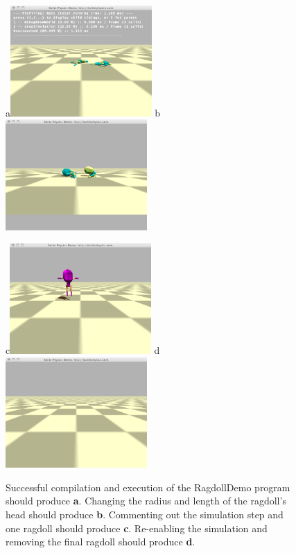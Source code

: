 \documentclass[12pt]{article}
\begin{document}
\begin{figure}[!t]
\centerline{
a\includegraphics[width=0.48\textwidth]{Fig1a}
b\includegraphics[width=0.48\textwidth]{Fig1b}
}
\centerline{
c\includegraphics[width=0.48\textwidth]{Fig2}
d\includegraphics[width=0.48\textwidth]{Fig1d}
}
\caption{
Successful compilation and execution of the RagdollDemo program should produce \textbf{a}.
Changing the radius and length of the ragdoll's head should produce \textbf{b}.
Commenting out the simulation step and one ragdoll should produce \textbf{c}. 
Re-enabling the simulation and removing the final ragdoll should produce \textbf{d}.}
\label{Fig}
\end{figure}
\end{document}
